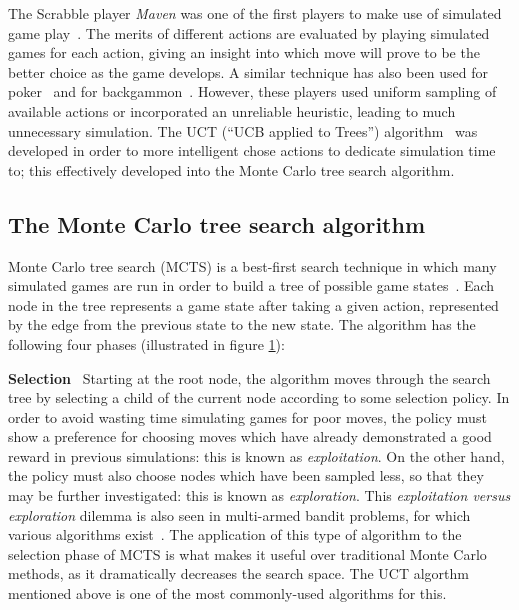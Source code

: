 The Scrabble player \emph{Maven} was one of the first players to make use of simulated game play~\citep{Sheppard2002}.  The merits of different actions are evaluated by playing simulated games for each action, giving an insight into which move will prove to be the better choice as the game develops.  A similar technique has also been used for poker~\citep{Billings2002} and for backgammon~\citep{Tesauro1996}.  However, these players used uniform sampling of available actions or incorporated an unreliable heuristic, leading to much unnecessary simulation.  The UCT (``UCB applied to Trees'') algorithm~\citep{Kocsis2006} was developed in order to more intelligent chose actions to dedicate simulation time to; this effectively developed into the Monte Carlo tree search algorithm.

\subsection{The Monte Carlo tree search algorithm}

\begin{figure}
\label{fig:MCTS}
\end{figure}

Monte Carlo tree search (MCTS) is a best-first search technique in which many simulated games are run in order to build a tree of possible game states~\citep{Chaslot2008}.  Each node in the tree represents a game state after taking a given action, represented by the edge from the previous state to the new state.  The algorithm has the following four phases (illustrated in figure \ref{fig:MCTS}):

\textbf{Selection} ~Starting at the root node, the algorithm moves through the search tree by selecting a child of the current node according to some selection policy.  In order to avoid wasting time simulating games for poor moves, the policy must show a preference for choosing moves which have already demonstrated a good reward in previous simulations: this is known as \emph{exploitation}.  On the other hand, the policy must also choose nodes which have been sampled less, so that they may be further investigated: this is known as \emph{exploration}.  This \emph{exploitation versus exploration} dilemma is also seen in multi-armed bandit problems, for which various algorithms exist~\citep{Auer2002}.  The application of this type of algorithm to the selection phase of MCTS is what makes it useful over traditional Monte Carlo methods, as it dramatically decreases the search space.  The UCT algorthm~\citep{Kocsis2006} mentioned above is one of the most commonly-used algorithms for this.

